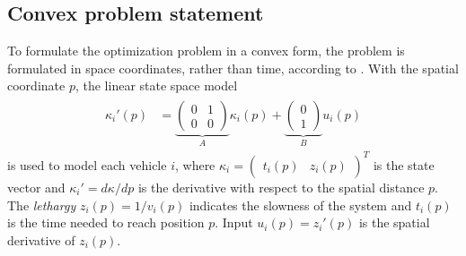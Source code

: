 \documentclass[letterpaper,10pt,conference]{ieeeconf}
\begin{document}
\subsection{Convex problem statement}
To formulate the optimization problem in a convex form, the problem is formulated in space coordinates, rather than time, according to \cite{nikolce}. With the spatial coordinate $p$, the linear state space model
\begin{align}\label{statesp}
\begin{split}
\kappa_i'(p)&=\underbrace{\begin{pmatrix}
0& 1\\
0& 0
\end{pmatrix}}_{{A}}\kappa_i(p) + \underbrace{\begin{pmatrix}
0\\
1\end{pmatrix}}_Bu_i(p)
\end{split}
\end{align}
is used to model each vehicle $i$, where $\kappa_i=\begin{pmatrix}t_i(p)& z_i(p)\end{pmatrix}^T$ is the state vector and $\kappa_i'=d\kappa/dp$ is the derivative with respect to the spatial distance $p$. The \emph{lethargy} \mbox{$z_i(p)=1/v_i(p)$} indicates the slowness of the system and $t_i(p)$ is the time needed to reach position $p$. Input $u_i(p)=z_i'(p)$ is the spatial derivative of $z_i(p)$.
\end{document}
